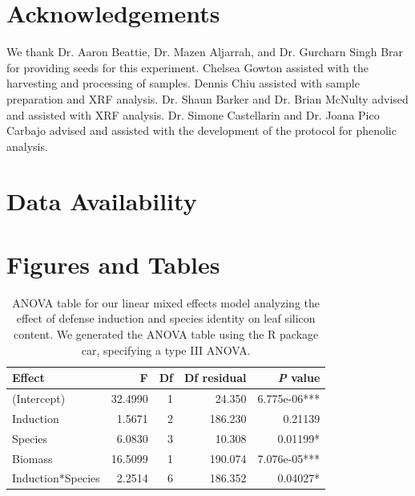 \documentclass[12pt, letterpaper, ]{report}
\begin{document}
\section{Acknowledgements}

We thank Dr. Aaron Beattie, Dr. Mazen Aljarrah, and Dr. Gurcharn Singh Brar for providing seeds for this experiment. Chelsea Gowton assisted with the harvesting and processing of samples. Dennis Chiu assisted with sample preparation and XRF analysis. Dr. Shaun Barker and Dr. Brian McNulty advised and assisted with XRF analysis. Dr. Simone Castellarin and Dr. Joana Pico Carbajo advised and assisted with the development of the protocol for phenolic analysis. 

\section{Data Availability}

\printbibliography

\section{Figures and Tables}

\begin{table}[ht]
        \centering
        \caption{ANOVA table for our linear mixed effects model analyzing the effect of defense induction and species identity on leaf silicon content. We generated the ANOVA table using the R package car, specifying a type III ANOVA.}
        \label{Tab:params}
        \begin{tabular}{lrrrr}
                \hline
                \textbf{Effect} & \textbf{F} & \textbf{Df} & \textbf{Df residual} & \textbf{\textit{P} value} \\
                \hline
                (Intercept) & 32.4990 & 1 & 24.350 & 6.775e-06*** \\
                Induction & 1.5671 & 2 & 186.230 & 0.21139 \\   
                Species & 6.0830 & 3 & 10.308 & 0.01199* \\ 
                Biomass & 16.5099 & 1 & 190.074 & 7.076e-05*** \\
                Induction*Species & 2.2514 & 6 & 186.352 & 0.04027* \\
                \hline
        \end{tabular}
\end{table}
\end{document}

